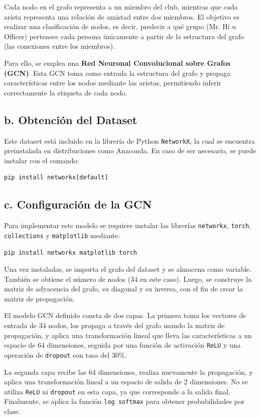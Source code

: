 \documentclass[11pt]{article} %
\begin{document}
Cada nodo en el grafo representa a un miembro del club, mientras que cada arista representa una relación de amistad entre dos miembros. El objetivo es realizar una clasificación de nodos, es decir, predecir a qué grupo (Mr. Hi u Officer) pertenece cada persona únicamente a partir de la estructura del grafo (las conexiones entre los miembros).

Para ello, se emplea una \textbf{Red Neuronal Convolucional sobre Grafos (GCN)}. Esta GCN toma como entrada la estructura del grafo y propaga características entre los nodos mediante las aristas, permitiendo inferir correctamente la etiqueta de cada nodo.

\subsection{b. Obtención del Dataset}
Este dataset está incluido en la librería de Python \texttt{NetworkX}, la cual se encuentra preinstalada en distribuciones como Anaconda. En caso de ser necesario, se puede instalar con el comando:

\begin{verbatim}
pip install networkx[default]
\end{verbatim}

\subsection{c. Configuración de la GCN}
Para implementar este modelo se requiere instalar las librerías \texttt{networkx}, \texttt{torch}, \texttt{collections} y \texttt{matplotlib} mediante:

\begin{verbatim}
pip install networkx matplotlib torch
\end{verbatim}

Una vez instaladas, se importa el grafo del dataset y se almacena como variable. También se obtiene el número de nodos (34 en este caso). Luego, se construye la matriz de adyacencia del grafo, su diagonal y su inversa, con el fin de crear la matriz de propagación.

El modelo GCN definido consta de dos capas. La primera toma los vectores de entrada de 34 nodos, los propaga a través del grafo usando la matriz de propagación, y aplica una transformación lineal que lleva las características a un espacio de 64 dimensiones, seguida por una función de activación \texttt{ReLU} y una operación de \texttt{dropout} con tasa del 30\%.

La segunda capa recibe las 64 dimensiones, realiza nuevamente la propagación, y aplica una transformación lineal a un espacio de salida de 2 dimensiones. No se utiliza \texttt{ReLU} ni \texttt{dropout} en esta capa, ya que corresponde a la salida final. Finalmente, se aplica la función \texttt{log softmax} para obtener probabilidades por clase.
\end{document}
